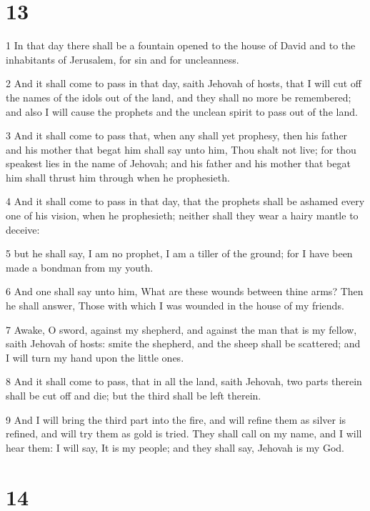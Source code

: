 \chapter{13}

\par 1 In that day there shall be a fountain opened to the house of David and to the inhabitants of Jerusalem, for sin and for uncleanness.
\par 2 And it shall come to pass in that day, saith Jehovah of hosts, that I will cut off the names of the idols out of the land, and they shall no more be remembered; and also I will cause the prophets and the unclean spirit to pass out of the land.
\par 3 And it shall come to pass that, when any shall yet prophesy, then his father and his mother that begat him shall say unto him, Thou shalt not live; for thou speakest lies in the name of Jehovah; and his father and his mother that begat him shall thrust him through when he prophesieth.
\par 4 And it shall come to pass in that day, that the prophets shall be ashamed every one of his vision, when he prophesieth; neither shall they wear a hairy mantle to deceive:
\par 5 but he shall say, I am no prophet, I am a tiller of the ground; for I have been made a bondman from my youth.
\par 6 And one shall say unto him, What are these wounds between thine arms? Then he shall answer, Those with which I was wounded in the house of my friends.
\par 7 Awake, O sword, against my shepherd, and against the man that is my fellow, saith Jehovah of hosts: smite the shepherd, and the sheep shall be scattered; and I will turn my hand upon the little ones.
\par 8 And it shall come to pass, that in all the land, saith Jehovah, two parts therein shall be cut off and die; but the third shall be left therein.
\par 9 And I will bring the third part into the fire, and will refine them as silver is refined, and will try them as gold is tried. They shall call on my name, and I will hear them: I will say, It is my people; and they shall say, Jehovah is my God.

\chapter{14}

